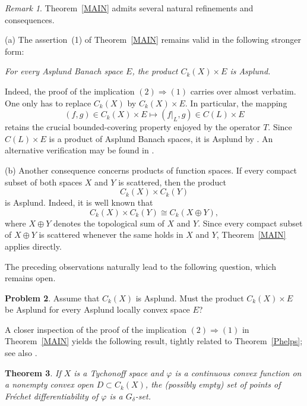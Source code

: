 \documentclass[12pt]{amsart}
\theoremstyle{plain}
\newtheorem{theorem}{Theorem}[section]
\theoremstyle{definition}
\newtheorem{problem}[theorem]{Problem}
\theoremstyle{remark}
\newtheorem{remark}[theorem]{Remark}
\def\vv{\varphi}
\begin{document}
\begin{remark}
Theorem~\ref{MAIN} admits several natural refinements and consequences.

\smallskip

\noindent
(a) The assertion~(1) of Theorem~\ref{MAIN} remains valid in the following stronger form:

\medskip

\centerline{\sl For every Asplund Banach space $E$, the product $C_k(X)\times E$ is Asplund.}

\medskip

Indeed, the proof of the implication $(2)\Rightarrow(1)$ carries over almost verbatim. One only has to replace $C_k(X)$ by $C_k(X)\times E$. In particular, the mapping
\[
(f,g)\in C_k(X)\times E \longmapsto (f|_L,g)\in C(L)\times E
\]
retains the crucial bounded-covering property enjoyed by the operator $T$. Since $C(L)\times E$ is a product of Asplund Banach spaces, it is Asplund by \cite{np}. An alternative verification may be found in \cite{es}.

\smallskip

\noindent
(b) Another consequence concerns products of function spaces. If every compact subset of both spaces $X$ and $Y$ is scattered, then the product
\[
C_k(X)\times C_k(Y)
\]
is Asplund. Indeed, it is well known that
\[
C_k(X)\times C_k(Y)\cong C_k(X\oplus Y),
\]
where $X\oplus Y$ denotes the topological sum of $X$ and $Y$. Since every compact subset of $X\oplus Y$ is scattered whenever the same holds in $X$ and $Y$, Theorem~\ref{MAIN} applies directly.
\end{remark}

The preceding observations naturally lead to the following question, which remains open.

\begin{problem}
Assume that $C_k(X)$ is Asplund. Must the product $C_k(X)\times E$ be Asplund for every Asplund locally convex space $E$?
\end{problem}

A closer inspection of the proof of the implication $(2)\Rightarrow(1)$ in Theorem~\ref{MAIN} yields the following result, tightly related to Theorem~\ref{Phelps}; see also \cite[Theorem~3.2 and Example~3.6]{es}.

\begin{theorem}\label{first}
If $X$ is a Tychonoff space and $\vv$ is a continuous convex function on a nonempty  convex open  $D\subset C_k(X)$,
the (possibly empty) set of points of Fr\'echet differentiability of $\vv$ is a $G_{\delta}$-set.
\end{theorem}
\end{document}
